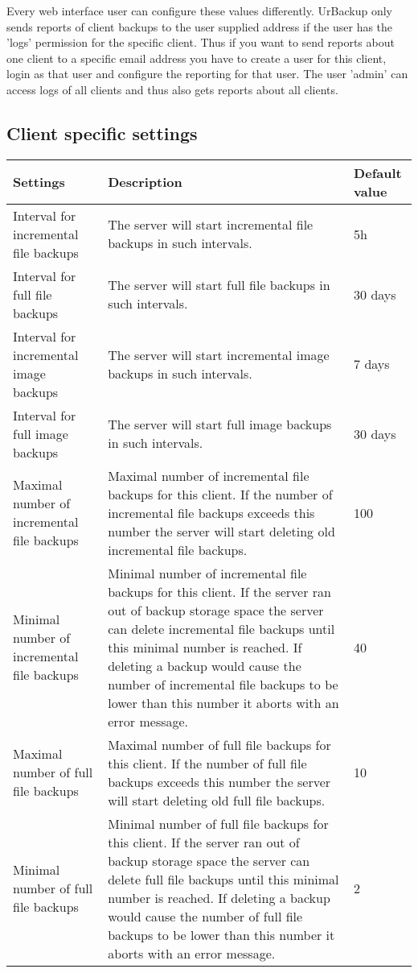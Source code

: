 \documentclass[a4paper,10pt]{article}
\begin{document}
Every web interface user can configure these values differently. UrBackup only sends reports of client backups to the user supplied address if the user has the 'logs' permission for the specific client. Thus if you want to send reports about one client to a specific email address you have to create a user for this client, login as that user and configure the reporting for that user. The user 'admin' can access logs of all clients and thus also gets reports about all clients.

\subsection{Client specific settings}

\begin{longtable}{|p{}|p{}|p{}|}
\hline
Settings  & Description & Default value\\
\hline\hline
Interval for incremental file backups & The server will start incremental file backups in such intervals. & 5h\\
\hline
Interval for full file backups & The server will start full file backups in such intervals. & 30 days\\
\hline
Interval for incremental image backups & The server will start incremental image backups in such intervals. & 7 days\\
\hline
Interval for full image backups & The server will start full image backups in such intervals. & 30 days\\
\hline
Maximal number of incremental file backups & Maximal number of incremental file backups for this client. If the number of
 incremental file backups exceeds this number the server will start deleting old incremental file backups. & 100\\
\hline 
Minimal number of incremental file backups & Minimal number of incremental file backups for this client. If the server ran out of backup storage space the server can delete incremental file backups until this minimal number is reached. If deleting a backup would cause the number of incremental file backups to be lower than this number it aborts with an error message. & 40\\
\hline
Maximal number of full file backups & Maximal number of full file backups for this client. If the number of
 full file backups exceeds this number the server will start deleting old full file backups. & 10\\
\hline
Minimal number of full file backups & Minimal number of full file backups for this client. If the server ran out of backup storage space the server can delete full file backups until this minimal number is reached. If deleting a backup would cause the number of full file backups to be lower than this number it aborts with an error message. & 2\\

\end{longtable}
\end{document}

